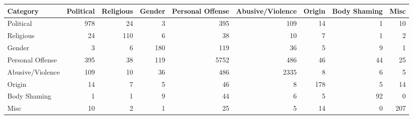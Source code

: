 \begin{tabular}{lrrrrrrrr}
\toprule
Category & Political & Religious & Gender & Personal Offense & Abusive/Violence & Origin & Body Shaming & Misc \\
\midrule
Political & 978 & 24 & 3 & 395 & 109 & 14 & 1 & 10 \\
Religious & 24 & 110 & 6 & 38 & 10 & 7 & 1 & 2 \\
Gender & 3 & 6 & 180 & 119 & 36 & 5 & 9 & 1 \\
Personal Offense & 395 & 38 & 119 & 5752 & 486 & 46 & 44 & 25 \\
Abusive/Violence & 109 & 10 & 36 & 486 & 2335 & 8 & 6 & 5 \\
Origin & 14 & 7 & 5 & 46 & 8 & 178 & 5 & 14 \\
Body Shaming & 1 & 1 & 9 & 44 & 6 & 5 & 92 & 0 \\
Misc & 10 & 2 & 1 & 25 & 5 & 14 & 0 & 207 \\
\bottomrule
\end{tabular}
